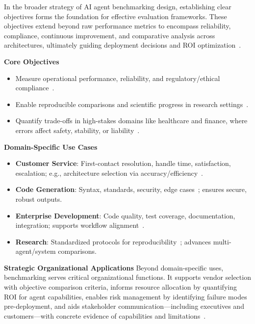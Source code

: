 \begin{TNtwocol}
In the broader strategy of AI agent benchmarking design, establishing clear objectives forms the foundation for effective evaluation frameworks. These objectives extend beyond raw performance metrics to encompass reliability, compliance, continuous improvement, and comparative analysis across architectures, ultimately guiding deployment decisions and ROI optimization~\cite{deeplearningai2024,arize2024,ibm2024}.

\textbf{Core Objectives}
\begin{itemize}
\item Measure operational performance, reliability, and regulatory/ethical compliance~\cite{deeplearningai2024}.
\item Enable reproducible comparisons and scientific progress in research settings~\cite{liu2023,kiela2021}.
\item Quantify trade-offs in high-stakes domains like healthcare and finance, where errors affect safety, stability, or liability~\cite{nori2023,thirunavukarasu2023}.
\end{itemize}

\textbf{Domain-Specific Use Cases}
\begin{itemize}
\item \textbf{Customer Service}: First-contact resolution, handle time, satisfaction, escalation; e.g., architecture selection via accuracy/efficiency~\cite{googlecloud2024}.
\item \textbf{Code Generation}: Syntax, standards, security, edge cases~\cite{jimenez2024}; ensures secure, robust outputs.
\item \textbf{Enterprise Development}: Code quality, test coverage, documentation, integration; supports workflow alignment~\cite{aws2024}.
\item \textbf{Research}: Standardized protocols for reproducibility~\cite{liu2023,kiela2021}; advances multi-agent/system comparisons.
\end{itemize}

\textbf{Strategic Organizational Applications}
Beyond domain-specific uses, benchmarking serves critical organizational functions. It supports vendor selection with objective comparison criteria, informs resource allocation by quantifying ROI for agent capabilities, enables risk management by identifying failure modes pre-deployment, and aids stakeholder communication---including executives and customers---with concrete evidence of capabilities and limitations~\cite{ibm2024,liu2023}.


\end{TNtwocol}
